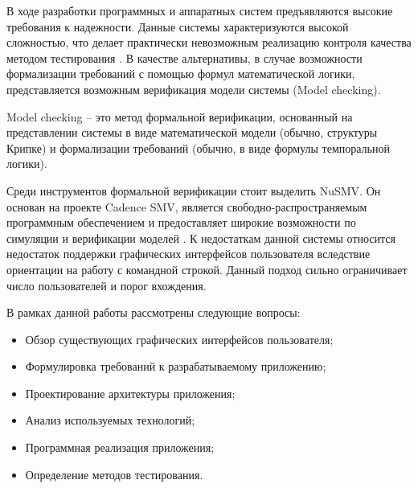 \intro

В ходе разработки программных и аппаратных систем предъявляются высокие требования к надежности. Данные системы характеризуются высокой сложностью, что делает практически невозможным реализацию контроля качества методом тестирования \cite{mironov-book}. В качестве альтернативы, в случае возможности формализации требований с помощью формул математической логики, представляется возможным верификация модели системы (Model checking). 

Model checking -- это метод формальной верификации, основанный на представлении системы в виде математической модели (обычно, структуры Крипке) и формализации требований (обычно, в виде формулы темпоральной логики). 

Среди инструментов формальной верификации стоит выделить NuSMV. Он основан на проекте Cadence SMV, является свободно-распространяемым программным обеспечением и предоставляет широкие возможности по симуляции и верификации моделей \cite{karpov-book}. К недостаткам данной системы относится недостаток поддержки графических интерфейсов пользователя вследствие ориентации на работу с командной строкой. Данный подход сильно ограничивает число пользователей и порог вхождения. 

В рамках данной работы рассмотрены следующие вопросы:

\begin{itemize}
	\item Обзор существующих графических интерфейсов пользователя;
	\item Формулировка требований к разрабатываемому приложению;
	\item Проектирование архитектуры приложения;
	\item Анализ используемых технологий;
	\item Программная реализация приложения;
	\item Определение методов тестирования.
\end{itemize}